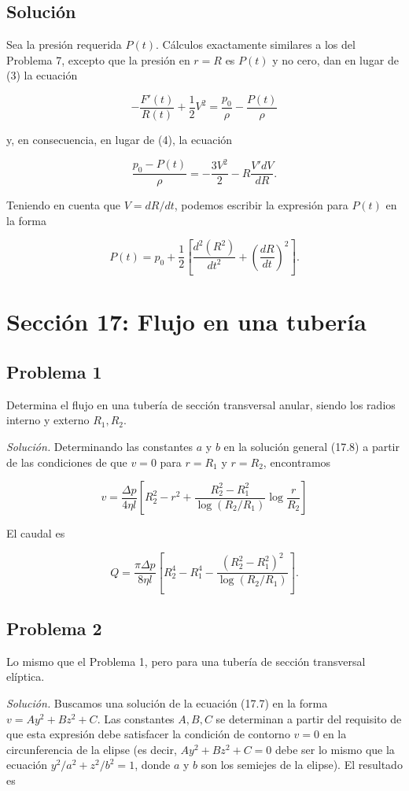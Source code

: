 \documentclass{article}
\begin{document}
\subsection*{Solución}

Sea la presión requerida $P(t)$. Cálculos exactamente similares a los del Problema 7, excepto que la presión en $r = R$ es $P(t)$ y no cero, dan en lugar de (3) la ecuación

$$
-\frac{F'(t)}{R(t)} + \frac{1}{2} V^2 = \frac{p_0}{\rho} - \frac{P(t)}{\rho}
$$

y, en consecuencia, en lugar de (4), la ecuación

$$
\frac{p_0 - P(t)}{\rho} = -\frac{3V^2}{2} - R \frac{V' dV}{dR}.
$$

Teniendo en cuenta que $V = dR/dt$, podemos escribir la expresión para $P(t)$ en la forma

$$
P(t) = p_0 + \frac{1}{2} \left[ \frac{d^2(R^2)}{dt^2} + \left( \frac{dR}{dt} \right)^2 \right].
$$

\section*{Sección 17: Flujo en una tubería}

\subsection*{Problema 1}

Determina el flujo en una tubería de sección transversal anular, siendo los radios interno y externo $R_1, R_2$.

\textit{Solución.} Determinando las constantes $a$ y $b$ en la solución general (17.8) a partir de las condiciones de que $v = 0$ para $r = R_1$ y $r = R_2$, encontramos

$$
v = \frac{\Delta p}{4\eta l} \left[ R_2^2 - r^2 + \frac{R_2^2 - R_1^2}{\log(R_2/R_1)} \log \frac{r}{R_2} \right]
$$

El caudal es

$$
Q = \frac{\pi \Delta p}{8\eta l} \left[ R_2^4 - R_1^4 - \frac{(R_2^2 - R_1^2)^2}{\log(R_2/R_1)} \right].
$$

\subsection*{Problema 2}

Lo mismo que el Problema 1, pero para una tubería de sección transversal elíptica.

\textit{Solución.} Buscamos una solución de la ecuación (17.7) en la forma $v = Ay^2 + Bz^2 + C$. Las constantes $A, B, C$ se determinan a partir del requisito de que esta expresión debe satisfacer la condición de contorno $v = 0$ en la circunferencia de la elipse (es decir, $Ay^2 + Bz^2 + C = 0$ debe ser lo mismo que la ecuación $y^2/a^2 + z^2/b^2 = 1$, donde $a$ y $b$ son los semiejes de la elipse). El resultado es
\end{document}
